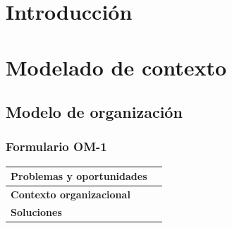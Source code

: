 \documentclass[a4paper,11pt]{article}
\begin{document}
	\section{Introducción}
	\section{Modelado de contexto}
		\subsection{Modelo de organización}
			\subsubsection{Formulario OM-1}
			\begin{center}
				\begin{tabular}{| l | l |}
					\hline
					\textbf{Problemas y oportunidades} & \\
					\hline
					\textbf{Contexto organizacional} & \\
					\hline
					\textbf{Soluciones} & \\
					\hline
				\end{tabular}
			\end{center}
\end{document}
